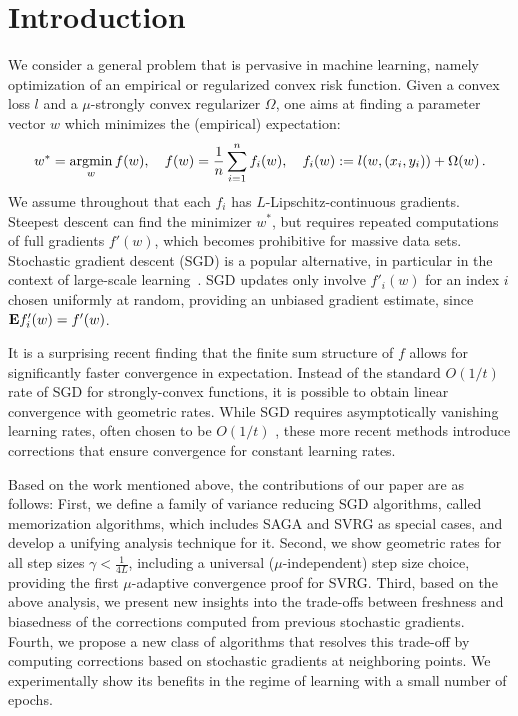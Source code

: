 %

\section{Introduction}

We consider a general problem that is pervasive in machine learning, namely optimization of an empirical or regularized convex risk function. Given a convex loss $l$ and a $\mu$-strongly convex regularizer $\Omega$, one aims at finding a parameter vector $w$ which minimizes the (empirical) expectation:
\begin{align}
w^* = \operatorname*{argmin}_w f(w), \quad f(w) = \frac 1n \sum_{i=1}^n f_i(w), \quad f_i(w) := l(w, (x_i,y_i)) + \Omega(w)\,.
\label{eq:problem}
\end{align}
We assume throughout that each $f_i$ has $L$-Lipschitz-continuous gradients. Steepest descent can find the minimizer $w^*$, but requires repeated computations of full gradients $f'(w)$, which becomes prohibitive for massive data sets. Stochastic gradient descent (SGD) is a popular alternative, in particular in the context of large-scale learning~\cite{bottou2010, shalev2011}. SGD updates only involve $f'_i(w)$ for an index $i$ chosen uniformly at random, providing an unbiased gradient estimate, since ${\mathbf E} f'_i(w) = f'(w)$. 

It is a surprising recent finding \cite{shalev2013stochastic,johnson2013,schmidt2013minimizing,konevcny2013} that the finite sum structure of $f$ allows for significantly faster convergence in expectation. Instead of the standard $O(1/t)$ rate of SGD for strongly-convex functions, it is possible to obtain linear convergence with geometric rates. While SGD requires asymptotically vanishing learning rates, often chosen to be $O(1/t)$ \cite{robbins1951}, these more recent methods introduce  corrections that ensure convergence for constant learning rates. 

Based on the work mentioned above, the contributions of our  paper are as follows: First, we define a family of variance reducing SGD algorithms, called memorization algorithms, which includes  SAGA and SVRG as special cases, and develop a unifying  analysis technique for it. Second, we show geometric rates for all step sizes $\gamma < \frac 1{4L}$, including a universal ($\mu$-independent) step size choice, providing the first $\mu$-adaptive convergence proof for SVRG. Third, based on the above analysis, we present new insights into the trade-offs between freshness and biasedness of the corrections computed from previous stochastic gradients. Fourth, we propose a new class of algorithms that resolves this trade-off by computing corrections based on stochastic gradients at neighboring points. We experimentally show its benefits  in the regime of  learning with  a small number of epochs. 

